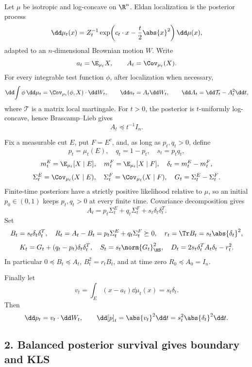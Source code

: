 \documentclass[../main.tex]{subfiles}
\begin{document}
Let $\mu$ be isotropic and log-concave on $\R^n$.  Eldan localization is the posterior process
\[
  \dd\mu_t(x)=Z_t^{-1}\exp\!\left(c_t\cdot x-\frac t2\abs{x}^2\right)\dd\mu(x),
\]
adapted to an $n$-dimensional Brownian motion $W$.  Write
\[
 a_t=\E_{\mu_t}X,\qquad A_t=\Cov_{\mu_t}(X).
\]
For every integrable test function $\phi$, after localization when necessary,
\begin{equation}\label{eq:sol-loc-martingale}
 \dd\!\int\phi\,\dd\mu_t=\Cov_{\mu_t}(\phi,X)\cdot\dd W_t,
 \qquad
 \dd a_t=A_t\dd W_t,
 \qquad
 \dd A_t=\dd\mathcal T_t-A_t^2\dd t,
\end{equation}
where $\mathcal T$ is a matrix local martingale.  For $t>0$, the posterior is
$t$-uniformly log-concave, hence Brascamp--Lieb gives
\begin{equation}\label{eq:sol-BL-cap}
 A_t\preceq t^{-1}I_n.
\end{equation}

Fix a measurable cut $E$, put $F=E^c$, and, as long as $p_t,q_t>0$, define
\[
 p_t=\mu_t(E),\quad q_t=1-p_t,\quad s_t=p_tq_t,
\]
\[
 m_t^E=\E_{\mu_t}[X\mid E],\quad m_t^F=\E_{\mu_t}[X\mid F],\quad
 \delta_t=m_t^E-m_t^F,
\]
\[
 \Sigma_t^E=\Cov_{\mu_t}(X\mid E),\quad
 \Sigma_t^F=\Cov_{\mu_t}(X\mid F),\quad G_t=\Sigma_t^E-\Sigma_t^F.
\]
Finite-time posteriors have a strictly positive likelihood relative to $\mu$, so an initial
$p_0\in(0,1)$ keeps $p_t,q_t>0$ at every finite time.  Covariance decomposition gives
\begin{equation}\label{eq:sol-cov-decomp}
 A_t=p_t\Sigma_t^E+q_t\Sigma_t^F+s_t\delta_t\delta_t^T.
\end{equation}
Set
\[
 B_t=s_t\delta_t\delta_t^T,
 \quad R_t=A_t-B_t=p_t\Sigma_t^E+q_t\Sigma_t^F\succeq0,
 \quad r_t=\Tr B_t=s_t\abs{\delta_t}^2,
\]
\[
 K_t=G_t+(q_t-p_t)\delta_t\delta_t^T,
 \quad S_t=s_t\norm{G_t}_{\HS}^2,
 \quad D_t=2s_t\delta_t^TA_t\delta_t-r_t^2.
\]
In particular $0\preceq B_t\preceq A_t$, $B_t^2=r_tB_t$, and at time zero
$R_0\preceq A_0=I_n$.

Finally let
\[
 v_t=\int_E(x-a_t)\dd\mu_t(x)=s_t\delta_t.
\]
Then
\begin{equation}\label{eq:sol-p-qv}
 \dd p_t=v_t\cdot\dd W_t,
 \qquad \dd[p]_t=\abs{v_t}^2\dd t=s_t^2\abs{\delta_t}^2\dd t.
\end{equation}

\subsection*{2. Balanced posterior survival gives boundary and KLS}
\end{document}
